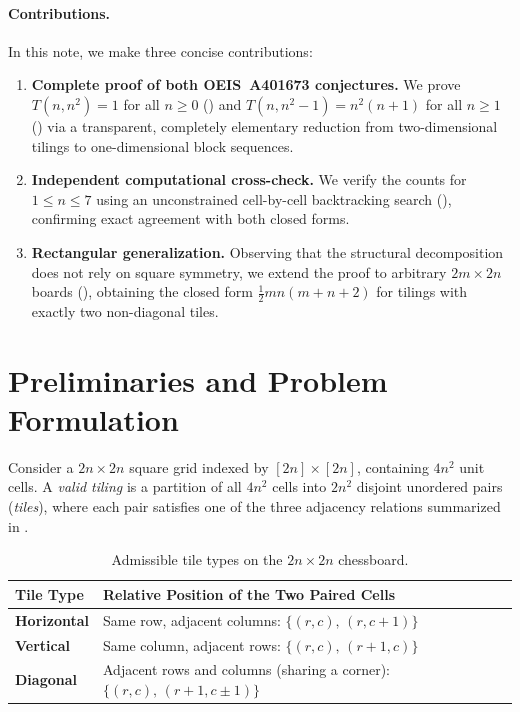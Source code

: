 \documentclass[11pt,a4paper]{article}
\theoremstyle{paperthm}
\theoremstyle{paperdef}
\begin{document}
\paragraph{Contributions.}
In this note, we make three concise contributions:
\begin{enumerate}[label=\textbf{(\arabic*)}]
  \item \textbf{Complete proof of both OEIS~A401673 conjectures.} We prove $T(n, n^2) = 1$ for all $n \ge 0$ () and $T(n, n^2 - 1) = n^2(n+1)$ for all $n \ge 1$ () via a transparent, completely elementary reduction from two-dimensional tilings to one-dimensional block sequences.
  \item \textbf{Independent computational cross-check.} We verify the counts for $1 \le n \le 7$ using an unconstrained cell-by-cell backtracking search (), confirming exact agreement with both closed forms.
  \item \textbf{Rectangular generalization.} Observing that the structural decomposition does not rely on square symmetry, we extend the proof to arbitrary $2m \times 2n$ boards (), obtaining the closed form $\frac{1}{2}mn(m+n+2)$ for tilings with exactly two non-diagonal tiles.
\end{enumerate}

\section{Preliminaries and Problem Formulation}
\label{sec:prelim}

Consider a $2n \times 2n$ square grid indexed by $[2n] \times [2n]$, containing $4n^2$ unit cells. A \emph{valid tiling} is a partition of all $4n^2$ cells into $2n^2$ disjoint unordered pairs (\emph{tiles}), where each pair satisfies one of the three adjacency relations summarized in .

\begin{table}[htbp]
  \centering
  \small
  \caption{Admissible tile types on the $2n \times 2n$ chessboard.}
  \label{tab:tiles}
  \begin{tabular}{@{} >{\bfseries}l l @{}}
    \toprule
    Tile Type & Relative Position of the Two Paired Cells \\
    \midrule
    Horizontal & Same row, adjacent columns: $\{(r,c),\,(r,c+1)\}$ \\
    Vertical   & Same column, adjacent rows: $\{(r,c),\,(r+1,c)\}$ \\
    Diagonal   & Adjacent rows and columns (sharing a corner): $\{(r,c),\,(r+1,c\pm 1)\}$ \\
    \bottomrule
  \end{tabular}
\end{table}
\end{document}
